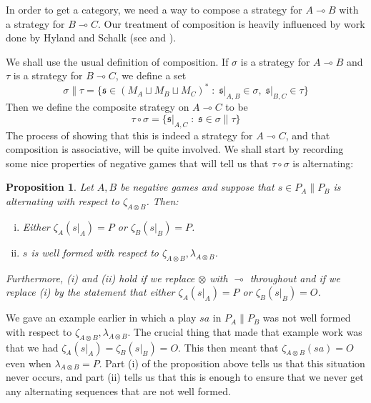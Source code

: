 \documentclass[11pt]{article} %
\theoremstyle{plain} %
\newtheorem{proposition}[theorem]{Proposition}
\theoremstyle{definition} %
\theoremstyle{note}
\theoremstyle{exercisestyle}
\newcommand{\tensor}{\otimes}
\renewcommand{\implies}{\multimap}
\newcommand{\comp}[2]{#1 \circ #2}
\newcommand{\cprd}{\sqcup}
\newcommand{\suchthat}{\;\colon\;}
\newcommand{\s}{\mathfrak s}
\begin{document}
In order to get a category, we need a way to compose a strategy for $A\implies B$ with a strategy for $B\implies C$.  Our treatment of composition is heavily influenced by work done by Hyland and Schalk (see \cite{hyland1997games} and \cite{hylandschalkgames}).  

We shall use the usual definition of composition.  If $\sigma$ is a strategy for $A\implies B$ and $\tau$ is a strategy for $B\implies C$, we define a set
\[
  \sigma\|\tau = \{\s\in (M_A \cprd M_B \cprd M_C)^*\suchthat \s\vert_{A,B}\in\sigma,\;\s\vert_{B,C}\in\tau\}
  \]
Then we define the composite strategy on $A\implies C$ to be
\[
  \comp\tau\sigma = \{\s\vert_{A,C}\suchthat\s\in\sigma\|\tau\}
  \]
The process of showing that this is indeed a strategy for $A\implies C$, and that composition is associative, will be quite involved.  We shall start by recording some nice properties of negative games that will tell us that $\comp\tau\sigma$ is alternating:

\begin{proposition}
  Let $A,B$ be negative games and suppose that $s\in P_A\|P_B$ is alternating with respect to $\zeta_{A\tensor B}$.  Then:
  \begin{enumerate}[i)]
    \item Either $\zeta_{A}(s\vert_A)=P$ or $\zeta_{B}(s\vert_B)=P$.  
    \item $s$ is well formed with respect to $\zeta_{A\tensor B},\lambda_{A\tensor B}$.  
  \end{enumerate}
  Furthermore, (i) and (ii) hold if we replace $\tensor$ with $\implies$ throughout and if we replace (i) by the statement that either $\zeta_A(s\vert_A)=P$ or $\zeta_B(s\vert_B)=O$.
  \label{nice-negative-games}
\end{proposition}

We gave an example earlier in which a play $sa$ in $P_A\|P_B$ was not well formed with respect to $\zeta_{A\tensor B},\lambda_{A\tensor B}$.  The crucial thing that made that example work was that we had $\zeta_A(s\vert_A)=\zeta_B(s\vert_B)=O$.  This then meant that $\zeta_{A\tensor B}(sa)=O$ even when $\lambda_{A\tensor B}=P$.  Part (i) of the proposition above tells us that this situation never occurs, and part (ii) tells us that this is enough to ensure that we never get any alternating sequences that are not well formed.
\end{document}
